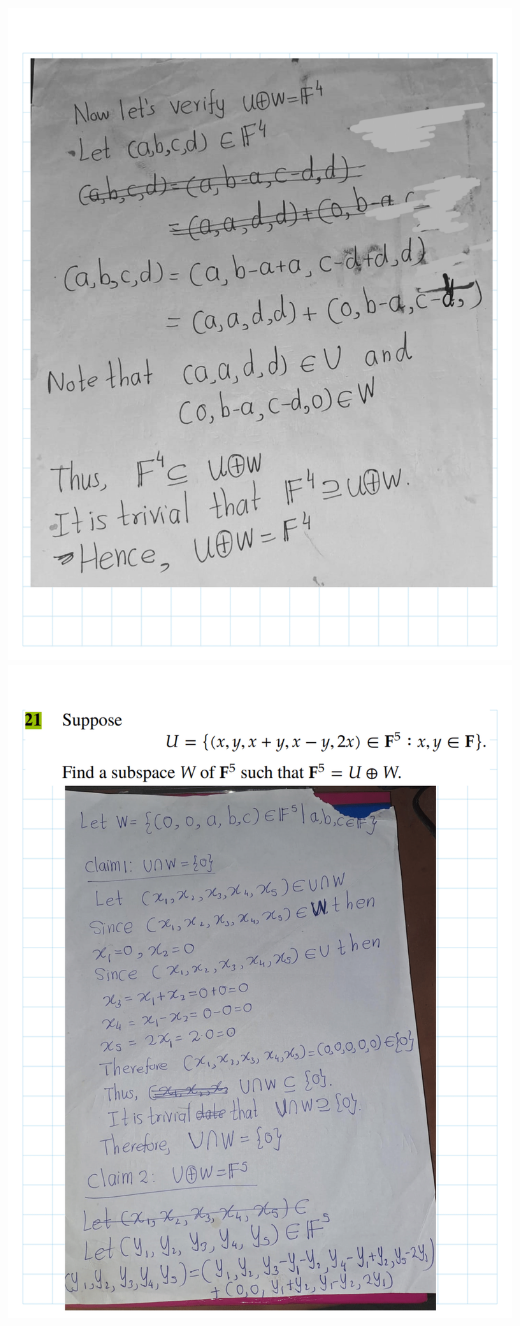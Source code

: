 \documentclass[
]{book}
\theoremstyle{definition}
\theoremstyle{definition}
\theoremstyle{definition}
\theoremstyle{definition}
\theoremstyle{remark}
\begin{document}
\begin{enumerate}
  \includegraphics{fig/Ex1C/Ex/Ex-24.png}
  \includegraphics{fig/Ex1C/Ex/Ex-25.png}

\end{enumerate}
\end{document}
